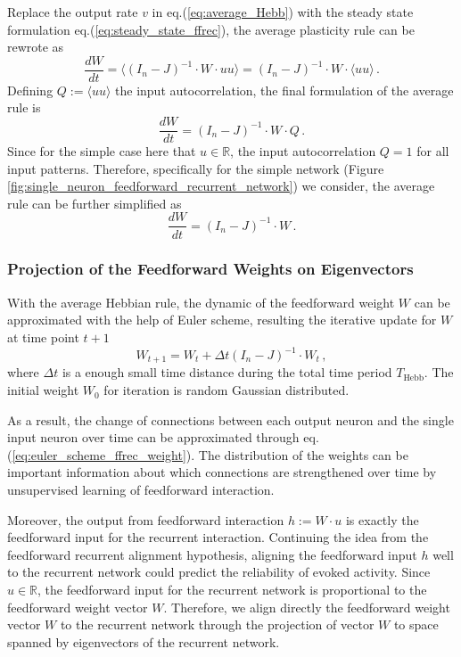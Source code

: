 \documentclass[11pt]{article}
\begin{document}
{	Replace the output rate $v$ in eq.(\ref{eq:average_Hebb}) with the steady state formulation eq.(\ref{eq:steady_state_ffrec}), the average plasticity rule can be rewrote as 
		\begin{equation}
			\frac{dW}{dt} = \langle (I_n - J)^{-1} \cdot W \cdot u u \rangle = (I_n - J)^{-1} \cdot W \cdot \langle uu \rangle \, .
		\end{equation}
	Defining $Q := \langle uu \rangle$ the input autocorrelation, the final formulation of the average rule is
		\begin{equation}
			\frac{dW}{dt} = (I_n - J)^{-1} \cdot W \cdot Q \, .
		\end{equation}
	Since for the simple case here that $u \in \mathbb{R}$, the input autocorrelation $Q = 1$ for all input patterns. Therefore, specifically for the simple network (Figure \ref{fig:single_neuron_feedforward_recurrent_network}) we consider, the average rule can be further simplified as
		\begin{equation} \label{eq:final_hebb_ff_weight}
			\frac{dW}{dt} = (I_n - J)^{-1} \cdot W \, .
		\end{equation} 

	\subsubsection{Projection of the Feedforward Weights on Eigenvectors}
	With the average Hebbian rule, the dynamic of the feedforward weight $W$ can be approximated with the help of Euler scheme, resulting the iterative update for $W$ at time point $t+1$
		\begin{equation} \label{eq:euler_scheme_ffrec_weight}
			W_{t+1} = W_t + \Delta t (I_n - J)^{-1} \cdot W_t \, , 
		\end{equation}
	where $\Delta t$ is a enough small time distance during the total time period $T_{\text{Hebb}}$. The initial weight $W_0$ for iteration is random Gaussian distributed.
	
	As a result, the change of connections between each output neuron and the single input neuron over time can be approximated through eq.(\ref{eq:euler_scheme_ffrec_weight}). The distribution of the weights can be important information about which connections are strengthened over time by unsupervised learning of feedforward interaction. 
	
	Moreover, the output from feedforward interaction $h := W \cdot u$ is exactly the feedforward input for the recurrent interaction.  Continuing the idea from the feedforward recurrent alignment hypothesis, aligning the feedforward input $h$ well to the recurrent network could predict the reliability of evoked activity. Since $u \in \mathbb{R}$, the feedforward input for the recurrent network is proportional to the feedforward weight vector $W$. Therefore, we align directly the feedforward weight vector $W$ to the recurrent network through the projection of vector $W$ to space spanned by eigenvectors of the recurrent network. 
	
}
\end{document}
